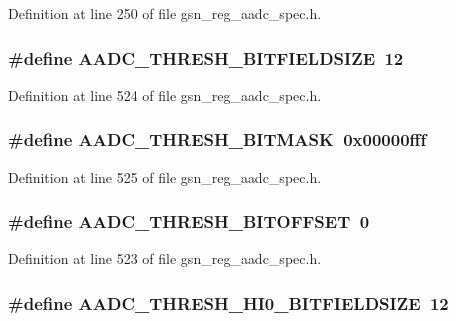 Definition at line 250 of file gsn\_\-reg\_\-aadc\_\-spec.h.

\hypertarget{a00543_a78967a706598ca7f4a7460f01c776376}{
\subsubsection[{AADC\_\-THRESH\_\-BITFIELDSIZE}]{\setlength{\rightskip}{0pt plus 5cm}\#define AADC\_\-THRESH\_\-BITFIELDSIZE~12}}
\label{a00543_a78967a706598ca7f4a7460f01c776376}


Definition at line 524 of file gsn\_\-reg\_\-aadc\_\-spec.h.

\hypertarget{a00543_ab1a9da6c69d39debc75ef9f355ee645d}{
\subsubsection[{AADC\_\-THRESH\_\-BITMASK}]{\setlength{\rightskip}{0pt plus 5cm}\#define AADC\_\-THRESH\_\-BITMASK~0x00000fff}}
\label{a00543_ab1a9da6c69d39debc75ef9f355ee645d}


Definition at line 525 of file gsn\_\-reg\_\-aadc\_\-spec.h.

\hypertarget{a00543_a55376b32c145a1551a35f2c9212c5133}{
\subsubsection[{AADC\_\-THRESH\_\-BITOFFSET}]{\setlength{\rightskip}{0pt plus 5cm}\#define AADC\_\-THRESH\_\-BITOFFSET~0}}
\label{a00543_a55376b32c145a1551a35f2c9212c5133}


Definition at line 523 of file gsn\_\-reg\_\-aadc\_\-spec.h.

\hypertarget{a00543_afb51feb79c64ec56f502f613045fdbd2}{
\subsubsection[{AADC\_\-THRESH\_\-HI0\_\-BITFIELDSIZE}]{\setlength{\rightskip}{0pt plus 5cm}\#define AADC\_\-THRESH\_\-HI0\_\-BITFIELDSIZE~12}}
\label{a00543_afb51feb79c64ec56f502f613045fdbd2}


